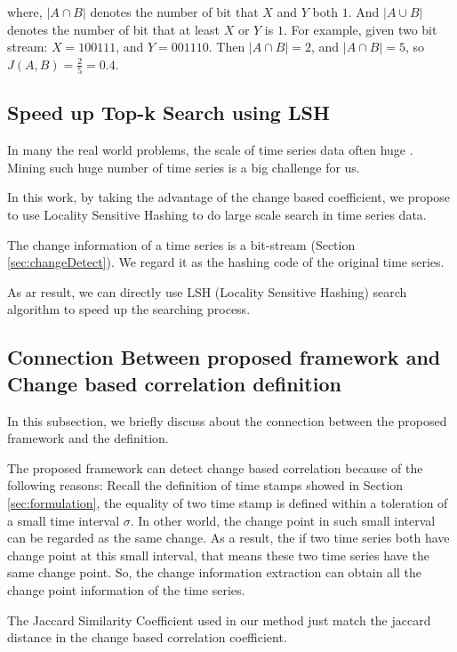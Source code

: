 where, $|A \cap B|$ denotes the number of bit that $X$ and $Y$ both $1$. And $|A \cup B|$ denotes the number of bit that at least $X$ or $Y$ is $1$.
For example, given two bit stream: $X={100111}$, and $Y={001110}$. Then $|A \cap B| = 2$, and $|A \cap B| = 5$, so $J(A,B) = \frac{2}{5} = 0.4$.


\subsection{Speed up Top-k Search using LSH}

In many the real world problems, the scale of time series data often huge \cite{rakthanmanon2012searching}. Mining such huge number of time series is a big challenge for us.

In this work, by taking the advantage of the change based coefficient, we propose to use Locality Sensitive Hashing to do large scale search in time series data.

The change information of a time series is a bit-stream (Section \ref{sec:changeDetect}). We regard it as the hashing code of the original time series.

As ar result, we can directly use LSH (Locality Sensitive Hashing) search algorithm to speed up the searching process. \cite{indyk1998approximate} 

\subsection{Connection Between proposed framework and Change based correlation definition}

In this subsection, we briefly discuss about the connection between the proposed framework and the definition.

The proposed framework can detect change based correlation because of the following reasons:
Recall the definition of time stamps showed in Section \ref{sec:formulation}, the equality of two time stamp is defined within a toleration of a small time interval $\sigma$. In other world, the change point in such small interval can be regarded as the same change. 
As a result, the if two time series both have change point at this small interval, that means  these two time series have the same change point.
So, the change information extraction can obtain all the change point information of the time series.

The Jaccard Similarity Coefficient used in our method just match the jaccard distance in the change based correlation coefficient.

